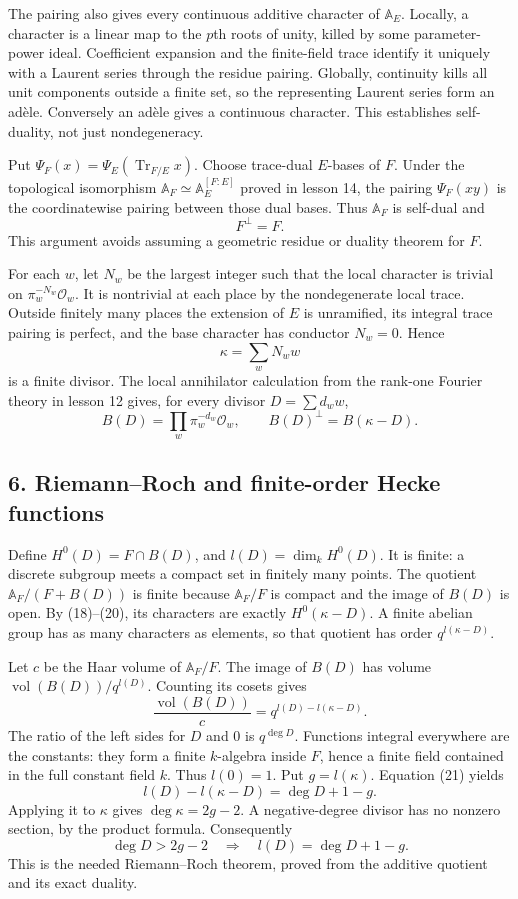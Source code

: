 \documentclass[11pt,a4paper]{article}
\begin{document}
The pairing also gives every continuous additive character of
\(\mathbb A_E\). Locally, a character is a linear map to the \(p\)th
roots of unity, killed by some parameter-power ideal. Coefficient
expansion and the finite-field trace identify it uniquely with a Laurent
series through the residue pairing. Globally, continuity kills all unit
components outside a finite set, so the representing Laurent series form
an adèle. Conversely an adèle gives a continuous character. This
establishes self-duality, not just nondegeneracy.

Put \(\Psi_F(x)=\Psi_E(\operatorname{Tr}_{F/E}x)\). Choose trace-dual
\(E\)-bases of \(F\). Under the topological isomorphism
\(\mathbb A_F\simeq\mathbb A_E^{[F:E]}\) proved in lesson 14, the
pairing \(\Psi_F(xy)\) is the coordinatewise pairing between those dual
bases. Thus \(\mathbb A_F\) is self-dual and \[
F^\perp=F.
\tag{18}
\] This argument avoids assuming a geometric residue or duality theorem
for \(F\).

For each \(w\), let \(N_w\) be the largest integer such that the local
character is trivial on \(\pi_w^{-N_w}\mathcal O_w\). It is nontrivial
at each place by the nondegenerate local trace. Outside finitely many
places the extension of \(E\) is unramified, its integral trace pairing
is perfect, and the base character has conductor \(N_w=0\). Hence \[
\kappa=\sum_w N_w w
\tag{19}
\] is a finite divisor. The local annihilator calculation from the
rank-one Fourier theory in lesson 12 gives, for every divisor
\(D=\sum d_w w\), \[
B(D)=\prod_w\pi_w^{-d_w}\mathcal O_w,\qquad
B(D)^\perp=B(\kappa-D).
\tag{20}
\]

\subsection{6. Riemann--Roch and finite-order Hecke
functions}\label{riemannroch-and-finite-order-hecke-functions}

Define \(H^0(D)=F\cap B(D)\), and \(l(D)=\dim_k H^0(D)\). It is finite:
a discrete subgroup meets a compact set in finitely many points. The
quotient \(\mathbb A_F/(F+B(D))\) is finite because \(\mathbb A_F/F\) is
compact and the image of \(B(D)\) is open. By (18)--(20), its characters
are exactly \(H^0(\kappa-D)\). A finite abelian group has as many
characters as elements, so that quotient has order \(q^{l(\kappa-D)}\).

Let \(c\) be the Haar volume of \(\mathbb A_F/F\). The image of \(B(D)\)
has volume \(\operatorname{vol}(B(D))/q^{l(D)}\). Counting its cosets
gives \[
\frac{\operatorname{vol}(B(D))}{c}
=q^{l(D)-l(\kappa-D)}.
\tag{21}
\] The ratio of the left sides for \(D\) and \(0\) is \(q^{\deg D}\).
Functions integral everywhere are the constants: they form a finite
\(k\)-algebra inside \(F\), hence a finite field contained in the full
constant field \(k\). Thus \(l(0)=1\). Put \(g=l(\kappa)\). Equation
(21) yields \[
l(D)-l(\kappa-D)=\deg D+1-g.
\tag{22}
\] Applying it to \(\kappa\) gives \(\deg\kappa=2g-2\). A
negative-degree divisor has no nonzero section, by the product formula.
Consequently \[
\deg D>2g-2\quad\Longrightarrow\quad l(D)=\deg D+1-g.
\tag{23}
\] This is the needed Riemann--Roch theorem, proved from the additive
quotient and its exact duality.
\end{document}
